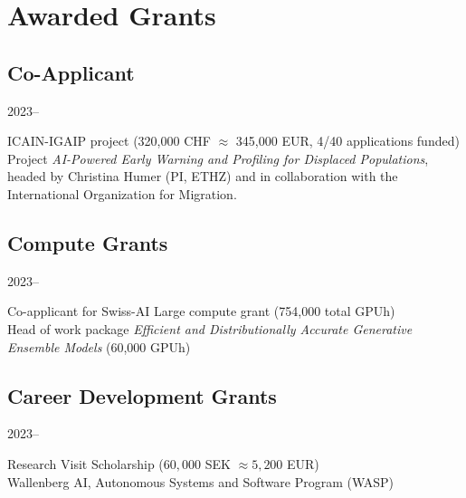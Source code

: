\section*{Awarded Grants}
\subsection*{Co-Applicant}
\begin{labeling}{2023--}
\item [2026] ICAIN-IGAIP project (320{,}000 CHF $\approx$ 345{,}000 EUR, 4/40 applications funded)\\
        Project \textit{AI-Powered Early Warning and Profiling for Displaced Populations}, headed by Christina Humer (PI, ETHZ) and in collaboration with the International Organization for Migration.  
\end{labeling}
\subsection*{Compute Grants}
\begin{labeling}{2023--}
    \item [2026] Co-applicant for Swiss-AI Large compute grant (754,000 total GPUh)\\
        Head of work package \textit{Efficient and Distributionally Accurate Generative Ensemble Models} (60,000 GPUh)
\end{labeling}
\subsection*{Career Development Grants}
\begin{labeling}{2023--}
    \item [2023] Research Visit Scholarship ($60{,}000$ SEK $\approx 5{,}200$ EUR)\\
        Wallenberg AI, Autonomous Systems and Software Program (WASP)

\end{labeling}

